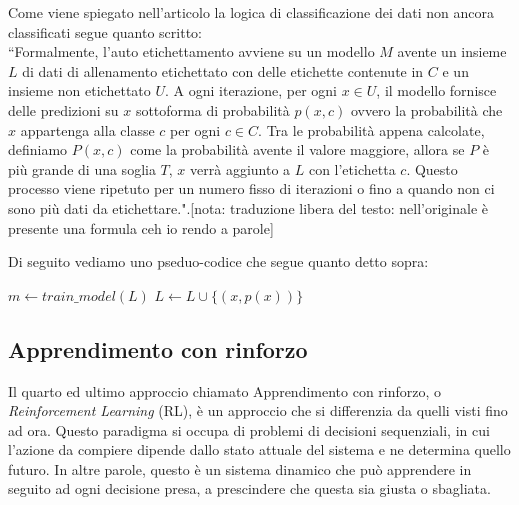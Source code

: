 \documentclass[12pt,italian]{report}
\begin{document}
Come viene spiegato nell'articolo \cite{ruder} %
la logica di classificazione dei dati non ancora classificati segue quanto scritto:		\\
``Formalmente, l'auto etichettamento avviene su un modello $ M $ avente un insieme $ L $ di dati di allenamento etichettato con delle etichette contenute in $ C $ e un insieme non etichettato $ U $. A ogni iterazione, per ogni $x \in U$, il modello fornisce delle predizioni su $ x $ sottoforma di probabilità $ p(x, c) $ ovvero la probabilità che $ x $ appartenga alla classe $ c $ per ogni $ c \in C $. Tra le probabilità appena calcolate, definiamo $ P(x, c) $ come la probabilità avente il valore maggiore, allora se $ P $ è più grande di una soglia $ T $, $ x $ verrà aggiunto a $ L $ con l'etichetta $ c $. Questo processo viene ripetuto per un numero fisso di iterazioni o fino a quando non ci sono più dati da etichettare.".[nota: traduzione libera del testo: nell'originale è presente una formula ceh io rendo a parole]

Di seguito vediamo uno pseduo-codice che segue quanto detto sopra:

\begin{algorithmic}[1]
	\Repeat
	\State $m \gets train\_model(L)$
	\State $L \gets L \cup \{(x, p(x))\}$
	\EndIf
	\EndFor
\end{algorithmic}

\subsection{Apprendimento con rinforzo}
Il quarto ed ultimo approccio chiamato Apprendimento con rinforzo, o \emph{Reinforcement Learning} (RL), è un approccio che si differenzia da quelli visti fino ad ora. Questo paradigma si occupa di problemi di decisioni sequenziali, in cui l'azione da compiere dipende dallo stato attuale del sistema e ne determina quello futuro. In altre parole, questo è un sistema dinamico che può apprendere in seguito ad ogni decisione presa, a prescindere che questa sia giusta o sbagliata.
\end{document}
